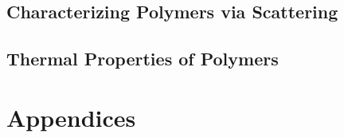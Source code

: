 \documentclass[book]{pogil}
\begin{document}
	\chapter{Characterizing Polymers via Scattering}
		
		

	\chapter{Thermal Properties of Polymers}
		
		
\part{Appendices}

\appendix

	


\backmatter
\end{document}

